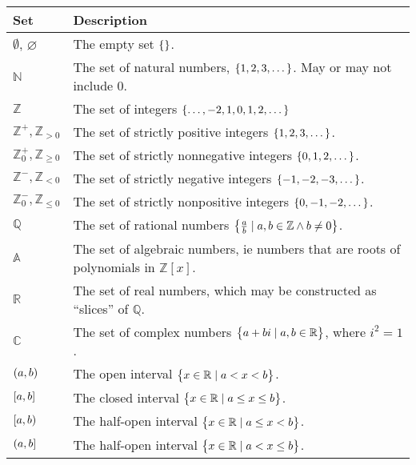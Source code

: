 \documentclass[fleqn,a4paper,11pt]{article}
\begin{document}
    \begin{longtable}{ll}
    \toprule
    \bfseries Set & \bfseries Description \\
    \midrule
    \endhead
    \(\emptyset\), \(\varnothing\) & The empty set \(\set{}\). \\
    \(\mathbb N\) & The set of natural numbers, \(\set{1, 2, 3, \dotsc}\).
                   May or may not include \(0\). \\
    \(\mathbb Z\) & The set of integers
                   \(\set{\dotsc, -2, 1, 0, 1, 2, \dotsc}\) \\
    \(\mathbb Z^+, \mathbb Z_{> 0}\) & The set of strictly positive integers
                   \(\set{1, 2, 3, \dotsc}\). \\
    \(\mathbb Z^+_0, \mathbb Z_{\ge 0}\) &
                   The set of strictly nonnegative integers
                   \(\set{0, 1, 2, \dotsc}\). \\
    \(\mathbb Z^-, \mathbb Z_{< 0}\) & The set of strictly negative integers
                   \(\set{-1, -2, -3, \dotsc}\). \\
    \(\mathbb Z^-_0, \mathbb Z_{\le 0}\) &
                   The set of strictly nonpositive integers
                   \(\set{0, -1, -2, \dotsc}\). \\
    \(\mathbb Q\) & The set of rational numbers
                   \(\set{\frac ab \mid a, b \in \mathbb Z \land b \neq 0}\).\\
    \(\mathbb A\) & The set of algebraic numbers, ie numbers that are roots of
                   polynomials in \(\mathbb Z[x]\). \\
    \(\mathbb R\) & The set of real numbers, which may be constructed as
                   ``slices'' of \(\mathbb Q\). \\
    \(\mathbb C\) & The set of complex numbers
                   \(\set{a + bi \mid a, b \in \mathbb R}\),
                   where \(i^2 = 1\).\\
    \(\intoo{a, b}\) & The open interval
                     \(\set{x \in \mathbb R \mid a < x < b}\).\\
    \(\intcc{a, b}\) & The closed interval
                     \(\set{x \in \mathbb R \mid a \le x \le b}\).\\
    \(\intco{a, b}\) & The half-open interval
                     \(\set{x \in \mathbb R \mid a \le x < b}\).\\
    \(\intoc{a, b}\) & The half-open interval
                     \(\set{x \in \mathbb R \mid a < x \le b}\).\\
    \bottomrule
    \end{longtable}
\end{document}

